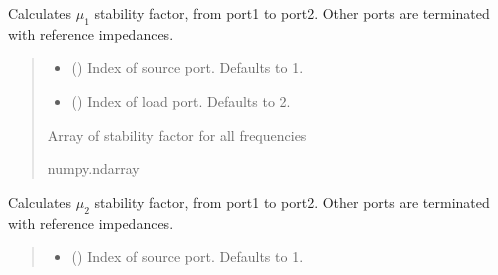 \documentclass[letterpaper,10pt,english]{sphinxmanual}
\begin{document}
\begin{fulllineitems}
\begin{fulllineitems}
\label{\detokenize{touchstone:touchstone.spfile.stability_factor_mu1}}
\pysigstartsignatures
{}
\pysigstopsignatures
\sphinxAtStartPar
Calculates \(\mu_1\) stability factor, from port1 to port2. Other ports are terminated with reference impedances.
\begin{quote}\begin{description}
\begin{itemize}
\item {} 
\sphinxAtStartPar
{} (\sphinxstyleliteralemphasis{\sphinxupquote{, }}) \textendash{} Index of source port. Defaults to 1.

\item {} 
\sphinxAtStartPar
{} (\sphinxstyleliteralemphasis{\sphinxupquote{, }}) \textendash{} Index of load port. Defaults to 2.

\end{itemize}

\sphinxAtStartPar
Array of stability factor for all frequencies

\sphinxAtStartPar
numpy.ndarray

\end{description}\end{quote}

\end{fulllineitems}


\begin{fulllineitems}
\label{\detokenize{touchstone:touchstone.spfile.stability_factor_mu2}}
\pysigstartsignatures
{}
\pysigstopsignatures
\sphinxAtStartPar
Calculates \(\mu_2\) stability factor, from port1 to port2. Other ports are terminated with reference impedances.
\begin{quote}\begin{description}
\begin{itemize}
\item {} 
\sphinxAtStartPar
{} (\sphinxstyleliteralemphasis{\sphinxupquote{, }}) \textendash{} Index of source port. Defaults to 1.


\end{itemize}
\end{description}
\end{quote}
\end{fulllineitems}
\end{fulllineitems}
\end{document}

